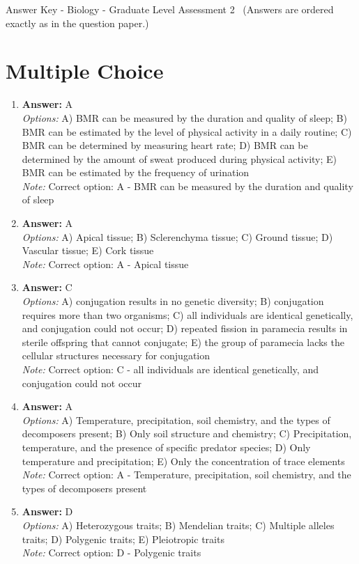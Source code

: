 \documentclass[12pt]{article}
\begin{document}
\begin{center}
Answer Key - Biology - Graduate Level Assessment 2 \
\small (Answers are ordered exactly as in the question paper.)
\end{center}

\section*{Multiple Choice}
\begin{enumerate}[label=\arabic*.]
\item \textbf{Answer:} A
\\ \textit{Options:} A) BMR can be measured by the duration and quality of sleep; B) BMR can be estimated by the level of physical activity in a daily routine; C) BMR can be determined by measuring heart rate; D) BMR can be determined by the amount of sweat produced during physical activity; E) BMR can be estimated by the frequency of urination
\\ \textit{Note:} Correct option: A - BMR can be measured by the duration and quality of sleep
\item \textbf{Answer:} A
\\ \textit{Options:} A) Apical tissue; B) Sclerenchyma tissue; C) Ground tissue; D) Vascular tissue; E) Cork tissue
\\ \textit{Note:} Correct option: A - Apical tissue
\item \textbf{Answer:} C
\\ \textit{Options:} A) conjugation results in no genetic diversity; B) conjugation requires more than two organisms; C) all individuals are identical genetically, and conjugation could not occur; D) repeated fission in paramecia results in sterile offspring that cannot conjugate; E) the group of paramecia lacks the cellular structures necessary for conjugation
\\ \textit{Note:} Correct option: C - all individuals are identical genetically, and conjugation could not occur
\item \textbf{Answer:} A
\\ \textit{Options:} A) Temperature, precipitation, soil chemistry, and the types of decomposers present; B) Only soil structure and chemistry; C) Precipitation, temperature, and the presence of specific predator species; D) Only temperature and precipitation; E) Only the concentration of trace elements
\\ \textit{Note:} Correct option: A - Temperature, precipitation, soil chemistry, and the types of decomposers present
\item \textbf{Answer:} D
\\ \textit{Options:} A) Heterozygous traits; B) Mendelian traits; C) Multiple alleles traits; D) Polygenic traits; E) Pleiotropic traits
\\ \textit{Note:} Correct option: D - Polygenic traits
\end{enumerate}
\end{document}
